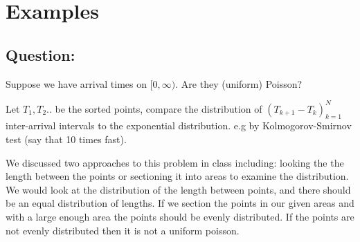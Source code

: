 \documentclass[12pt]{article}
\begin{document}
    \section{Examples}
    
    \subsection*{Question:}
    Suppose we have arrival times on $[0,\infty).$ Are they (uniform) Poisson?
    
    Let $T_1,T_2..$ be the sorted points, compare the distribution of $(T_{k+1}-T_k)^{N}_{k=1}$ inter-arrival intervals to the exponential distribution. e.g by Kolmogorov-Smirnov test (say that 10 times fast).
    
    We discussed two approaches to this problem in class including: looking the the length between the points or sectioning it into areas to examine the distribution. We would look at the distribution of the length between points, and there should be an equal distribution of lengths.
    If we section the points in our given areas and with a large enough area the points should be evenly distributed. If the points are not evenly distributed then it is not a uniform poisson. 
    
\end{document}
